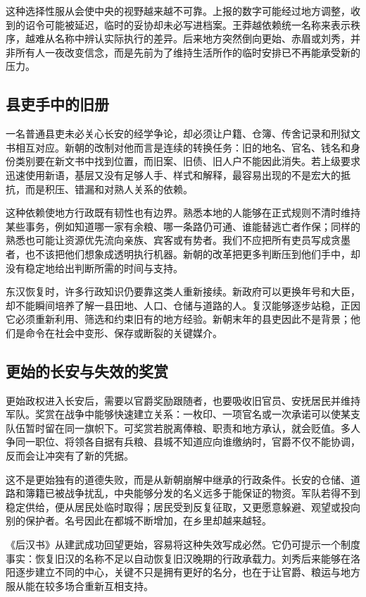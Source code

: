 这种选择性服从会使中央的视野越来越不可靠。上报的数字可能经过地方调整，收到的诏令可能被延迟，临时的妥协却未必写进档案。王莽越依赖统一名称来表示秩序，越难从名称中辨认实际执行的差异。后来地方突然倒向更始、赤眉或刘秀，并非所有人一夜改变信念，而是先前为了维持生活所作的临时安排已不再能承受新的压力。

\subsection{县吏手中的旧册}

一名普通县吏未必关心长安的经学争论，却必须让户籍、仓簿、传舍记录和刑狱文书相互对应。新朝的改制对他而言是连续的转换任务：旧的地名、官名、钱名和身份类别要在新文书中找到位置，而旧案、旧债、旧人户不能因此消失。若上级要求迅速使用新语，基层又没有足够人手、样式和解释，最容易出现的不是宏大的抵抗，而是积压、错漏和对熟人关系的依赖。

这种依赖使地方行政既有韧性也有边界。熟悉本地的人能够在正式规则不清时维持某些事务，例如知道哪一家有余粮、哪一条路仍可通、谁能替逃亡者作保；同样的熟悉也可能让资源优先流向亲族、宾客或有势者。我们不应把所有吏员写成贪墨者，也不该把他们想象成透明执行机器。新朝的改革把更多判断压到他们手中，却没有稳定地给出判断所需的时间与支持。

东汉恢复时，许多行政知识仍要靠这类人重新接续。新政府可以更换年号和大臣，却不能瞬间培养了解一县田地、人口、仓储与道路的人。复汉能够逐步站稳，正因它必须重新利用、筛选和约束旧有的地方经验。新朝末年的县吏因此不是背景；他们是命令在社会中变形、保存或断裂的关键媒介。

\subsection{更始的长安与失效的奖赏}

更始政权进入长安后，需要以官爵奖励跟随者，也要吸收旧官员、安抚居民并维持军队。奖赏在战争中能够快速建立关系：一枚印、一项官名或一次承诺可以使某支队伍暂时留在同一旗帜下。可奖赏若脱离俸粮、职责和地方承认，就会贬值。多人争同一职位、将领各自据有兵粮、县城不知道应向谁缴纳时，官爵不仅不能协调，反而会让冲突有了新的凭据。

这不是更始独有的道德失败，而是从新朝崩解中继承的行政条件。长安的仓储、道路和簿籍已被战争扰乱，中央能够分发的名义远多于能保证的物资。军队若得不到稳定供给，便从居民处临时取得；居民受到反复征取，又更愿意躲避、观望或投向别的保护者。名号因此在都城不断增加，在乡里却越来越轻。

《后汉书》从建武成功回望更始，容易将这种失效写成必然。它仍可提示一个制度事实：恢复旧汉的名称不足以自动恢复旧汉晚期的行政承载力。刘秀后来能够在洛阳逐步建立不同的中心，关键不只是拥有更好的名分，也在于让官爵、粮运与地方服从能在较多场合重新互相支持。

